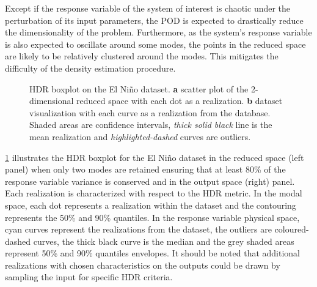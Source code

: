 Except if the response variable of the system of interest is chaotic under the perturbation of its input parameters, the POD is expected to drastically reduce the dimensionality of the problem. Furthermore, as the system's response variable is also expected to oscillate around some modes, the points in the reduced space are likely to be relatively clustered around the modes. This mitigates the difficulty of the density estimation procedure.

\begin{figure}[!h]               
\centering
{}
\caption{HDR boxplot on the El Ni\~no dataset. \textbf{a} scatter plot of the 2-dimensional reduced space with each dot as a realization. \textbf{b} dataset visualization with each curve as a realization from the database. Shaded areas are confidence intervals, \emph{thick solid black} line is the mean realization and \emph{highlighted-dashed} curves are outliers.}
\label{fig:elnino}
\end{figure}

\cref{fig:elnino} illustrates the HDR boxplot for the El Ni\~no dataset in the reduced space (left panel) when only two modes are retained ensuring that at least 80\% of the response variable variance is conserved and in the output space (right) panel. Each realization is characterized with respect to the HDR metric. In the modal space, each dot represents a realization within the dataset and the contouring represents the 50\% and 90\% quantiles. In the response variable physical space, cyan curves represent the realizations from the dataset, the outliers are coloured-dashed curves, the thick black curve is the median and the grey shaded areas represent 50\% and 90\% quantiles envelopes. It should be noted that additional realizations with chosen characteristics on the outputs could be drawn by sampling the input for specific HDR criteria.



